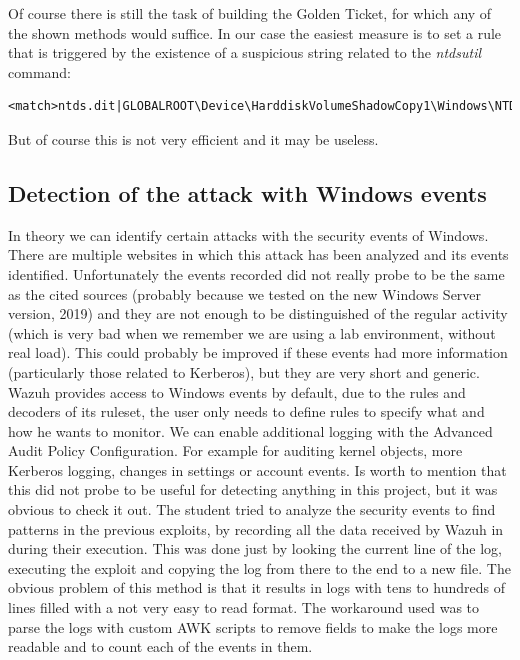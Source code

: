 Of course there is still the task of building the Golden Ticket, for which any of the shown methods would suffice.
\linej
\linej
In our case the easiest measure is to set a rule that is triggered by the existence of a suspicious string related to the \textit{ntdsutil} command:
\begin{lstlisting}[style=xml,numbers=none]
<match>ntds.dit|GLOBALROOT\Device\HarddiskVolumeShadowCopy1\Windows\NTDS</match>
\end{lstlisting}
But of course this is not very efficient and it may be useless.


\subsection{Detection of the attack with Windows events}
In theory we can identify certain attacks with the security events of Windows. There are multiple websites in which this attack has been analyzed and its events identified\cite{events_1}.
Unfortunately the events recorded did not really probe to be the same as the cited sources (probably because we tested on the new Windows Server version, 2019) and they are not enough to be distinguished of the regular activity (which is very bad when we remember we are using a lab environment, without real load). This could probably be improved if these events had more information (particularly those related to Kerberos), but they are very short and generic.
\linej
\linej
Wazuh provides access to Windows events by default, due to the rules and decoders of its ruleset\cite{wazuh_ossec_ruleset}, the user only needs to define rules to specify what and how he wants to monitor.
\linej
We can enable additional logging with the Advanced Audit Policy Configuration. For example for auditing kernel objects, more Kerberos logging, changes in settings or account events. Is worth to mention that this did not probe to be useful for detecting anything in this project, but it was obvious to check it out.
\linej
\linej
The student tried to analyze the security events to find patterns in the previous exploits, by recording all the data received by Wazuh in during their execution. This was done just by looking the current line of the log, executing the exploit and copying the log from there to the end to a new file.
\linej
The obvious problem of this method is that it results in logs with tens to hundreds of lines filled with a not very easy to read format. The workaround used was to parse the logs with custom AWK scripts to remove fields to make the logs more readable and to count each of the events in them.
